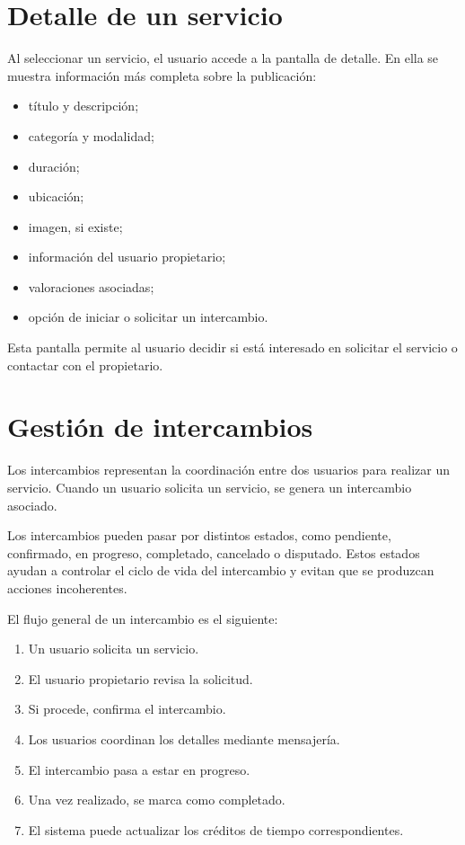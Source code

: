 \section{Detalle de un servicio}

Al seleccionar un servicio, el usuario accede a la pantalla de detalle. En ella se muestra información más completa sobre la publicación:

\begin{itemize}
    \item título y descripción;
    \item categoría y modalidad;
    \item duración;
    \item ubicación;
    \item imagen, si existe;
    \item información del usuario propietario;
    \item valoraciones asociadas;
    \item opción de iniciar o solicitar un intercambio.
\end{itemize}

Esta pantalla permite al usuario decidir si está interesado en solicitar el servicio o contactar con el propietario.

\section{Gestión de intercambios}

Los intercambios representan la coordinación entre dos usuarios para realizar un servicio. Cuando un usuario solicita un servicio, se genera un intercambio asociado.

Los intercambios pueden pasar por distintos estados, como pendiente, confirmado, en progreso, completado, cancelado o disputado. Estos estados ayudan a controlar el ciclo de vida del intercambio y evitan que se produzcan acciones incoherentes.

El flujo general de un intercambio es el siguiente:

\begin{enumerate}
    \item Un usuario solicita un servicio.
    \item El usuario propietario revisa la solicitud.
    \item Si procede, confirma el intercambio.
    \item Los usuarios coordinan los detalles mediante mensajería.
    \item El intercambio pasa a estar en progreso.
    \item Una vez realizado, se marca como completado.
    \item El sistema puede actualizar los créditos de tiempo correspondientes.
\end{enumerate}

